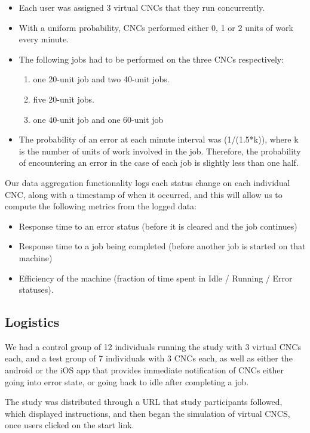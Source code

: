 \documentclass[12pt,letterpaper,titlepage]{article}
\newlength{\wideitemsep}
\let\olditem\item
\renewcommand{\item}{\setlength{\itemsep}{\wideitemsep}\olditem}
\begin{document}
\begin{itemize}
\item Each user was assigned 3 virtual CNCs that they run concurrently.
\item With a uniform probability, CNCs performed either 0, 1 or 2 units of work every minute.
\item The following jobs had to be performed on the three CNCs respectively:
\begin{enumerate}
\item one 20-unit job and two 40-unit jobs.
\item five 20-unit jobs.
\item one 40-unit job and one 60-unit job
\end{enumerate}
\item The probability of an error at each minute interval was (1/(1.5*k)), where k is the number of units of work involved in the job. Therefore, the probability of encountering an error in the case of each job is slightly less than one half.
\end{itemize}

Our data aggregation functionality logs each status change on each individual CNC, along with a timestamp of when it occurred, and this will allow us to compute the following metrics from the logged data:

\begin{itemize}
\item Response time to an error status (before it is cleared and the job continues)
\item Response time to a job being completed (before another job is started on that machine)
\item Efficiency of the machine (fraction of time spent in Idle / Running / Error statuses).
\end{itemize}

\subsection{Logistics}

We had a control group of 12 individuals running the study with 3 virtual CNCs each, and a test group of 7 individuals with 3 CNCs each, as well as either the android or the iOS app that provides immediate notification of CNCs either going into error state, or going back to idle after completing a job.

The study was distributed through a URL that study participants followed, which displayed instructions, and then began the simulation of virtual CNCS, once users clicked on the start link.
\end{document}
